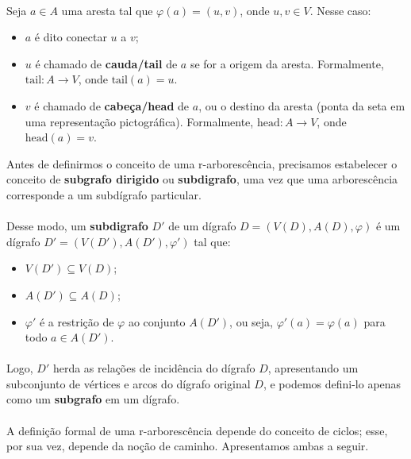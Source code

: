 \documentclass[12pt,a4paper]{article}
\begin{document}
\paragraph{}
Seja \(a \in A\) uma aresta tal que \(\varphi(a) = (u, v)\), onde \(u, v \in V\). Nesse caso:
\begin{itemize}
    \item \(a\) é dito conectar \(u\) a \(v\);
    \item \(u\) é chamado de \textbf{cauda/tail} de \(a\) se for a origem da aresta. Formalmente, \(\text{tail}: A \to V\), onde \(\text{tail}(a) = u\).
    \item \(v\) é chamado de \textbf{cabeça/head} de \(a\), ou o destino da aresta (ponta da seta em uma representação pictográfica). Formalmente, \(\text{head}: A \to V\), onde \(\text{head}(a) = v\).
\end{itemize}

Antes de definirmos o conceito de uma r-arborescência, precisamos estabelecer o conceito de \textbf{subgrafo dirigido} ou \textbf{subdigrafo}, uma vez que uma arborescência corresponde a um subdígrafo particular.

\paragraph{}
Desse modo, um \textbf{subdigrafo} \(D'\) de um dígrafo \(D = (V(D), A(D), \varphi)\) é um dígrafo \(D' = (V(D'), A(D'), \varphi')\) tal que:
\begin{itemize}
    \item \(V(D') \subseteq V(D)\);
    \item \(A(D') \subseteq A(D)\);
    \item \(\varphi'\) é a restrição de \(\varphi\) ao conjunto \(A(D')\), ou seja, \(\varphi'(a) = \varphi(a)\) para todo \(a \in A(D')\).
\end{itemize}

\paragraph{}
Logo, \(D'\) herda as relações de incidência do dígrafo \(D\), apresentando um subconjunto de vértices e arcos do dígrafo original \(D\), e podemos defini-lo apenas como um \textbf{subgrafo} em um dígrafo.

\paragraph{}
A definição formal de uma r-arborescência depende do conceito de ciclos; esse, por sua vez, depende da noção de caminho. Apresentamos ambas a seguir.
\end{document}
